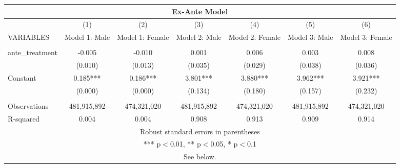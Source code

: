 \begin{tabular}{lcccccc}
\multicolumn{7}{c}{Ex-Ante Model} \\ \hline
 & (1) & (2) & (3) & (4) & (5) & (6) \\
VARIABLES & Model 1: Male & Model 1: Female & Model 2: Male & Model 2: Female & Model 3: Male & Model 3: Female \\ \hline
 &  &  &  &  &  &  \\
ante\_treatment & -0.005 & -0.010 & 0.001 & 0.006 & 0.003 & 0.008 \\
 & (0.010) & (0.013) & (0.035) & (0.029) & (0.038) & (0.036) \\
Constant & 0.185*** & 0.186*** & 3.801*** & 3.880*** & 3.962*** & 3.921*** \\
 & (0.000) & (0.000) & (0.134) & (0.180) & (0.157) & (0.232) \\
 &  &  &  &  &  &  \\
Observations & 481,915,892 & 474,321,020 & 481,915,892 & 474,321,020 & 481,915,892 & 474,321,020 \\
 R-squared & 0.004 & 0.004 & 0.908 & 0.913 & 0.909 & 0.914 \\ \hline
\multicolumn{7}{c}{ Robust standard errors in parentheses} \\
\multicolumn{7}{c}{ *** p$<$0.01, ** p$<$0.05, * p$<$0.1} \\
\multicolumn{7}{c}{ See below.} \\
\end{tabular}
